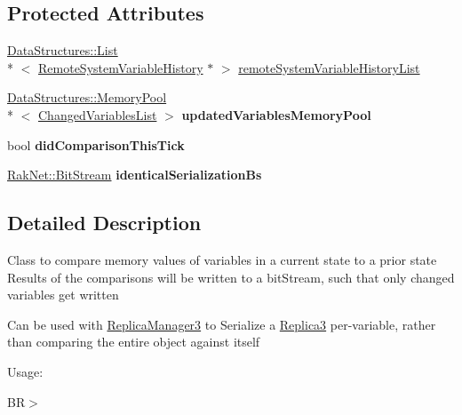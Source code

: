 \subsection*{Protected Attributes}
\begin{DoxyCompactItemize}
\item 
\hyperlink{class_data_structures_1_1_list}{Data\-Structures\-::\-List}\\*
$<$ \hyperlink{struct_rak_net_1_1_variable_delta_serializer_1_1_remote_system_variable_history}{Remote\-System\-Variable\-History} $\ast$ $>$ \hyperlink{class_rak_net_1_1_variable_delta_serializer_add5fe9e2912394be108cbe924c53c39b}{remote\-System\-Variable\-History\-List}
\item 
\hypertarget{class_rak_net_1_1_variable_delta_serializer_accfc67f45826b3aa612880654e553dc0}{\hyperlink{class_data_structures_1_1_memory_pool}{Data\-Structures\-::\-Memory\-Pool}\\*
$<$ \hyperlink{struct_rak_net_1_1_variable_delta_serializer_1_1_changed_variables_list}{Changed\-Variables\-List} $>$ {\bfseries updated\-Variables\-Memory\-Pool}}\label{class_rak_net_1_1_variable_delta_serializer_accfc67f45826b3aa612880654e553dc0}

\item 
\hypertarget{class_rak_net_1_1_variable_delta_serializer_ad3a7ca6857f44b07f9c8f0acab946217}{bool {\bfseries did\-Comparison\-This\-Tick}}\label{class_rak_net_1_1_variable_delta_serializer_ad3a7ca6857f44b07f9c8f0acab946217}

\item 
\hypertarget{class_rak_net_1_1_variable_delta_serializer_a76871cc416c4c905af5178853106deff}{\hyperlink{class_rak_net_1_1_bit_stream}{Rak\-Net\-::\-Bit\-Stream} {\bfseries identical\-Serialization\-Bs}}\label{class_rak_net_1_1_variable_delta_serializer_a76871cc416c4c905af5178853106deff}

\end{DoxyCompactItemize}


\subsection{Detailed Description}
Class to compare memory values of variables in a current state to a prior state Results of the comparisons will be written to a bit\-Stream, such that only changed variables get written\par
 Can be used with \hyperlink{class_rak_net_1_1_replica_manager3}{Replica\-Manager3} to Serialize a \hyperlink{class_rak_net_1_1_replica3}{Replica3} per-\/variable, rather than comparing the entire object against itself\par
 Usage\-:\par
 B\-R$>$ 


